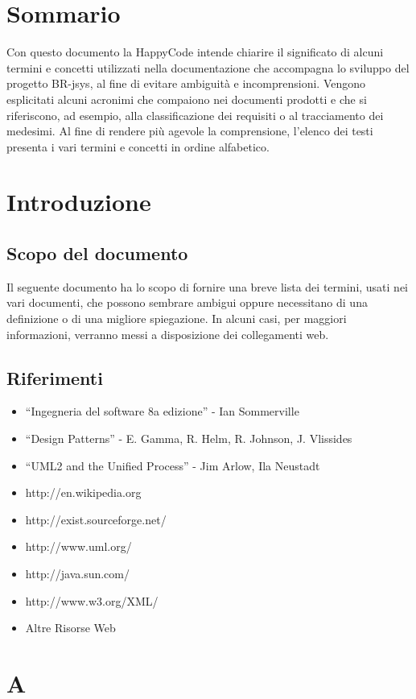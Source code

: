 \chapter*{Sommario}
Con questo documento la HappyCode intende chiarire il significato di alcuni termini e concetti utilizzati nella documentazione che accompagna
lo sviluppo del progetto BR-jsys, al fine di evitare ambiguit\`a e incomprensioni. Vengono esplicitati alcuni acronimi che compaiono nei documenti
prodotti e che si riferiscono, ad esempio, alla classificazione dei requisiti o al tracciamento dei medesimi.
Al fine di rendere pi\`u agevole la comprensione, l'elenco dei testi presenta i vari termini e concetti in ordine alfabetico.


\chapter{Introduzione}
\section{Scopo del documento}
Il seguente documento ha lo scopo di fornire una breve lista dei termini, usati nei vari documenti, che possono sembrare ambigui oppure necessitano di una definizione o di una migliore spiegazione. In alcuni casi, per maggiori informazioni, verranno messi a disposizione dei collegamenti web.
\section{Riferimenti}
\begin{itemize}
\item ``Ingegneria del software 8a edizione'' - Ian Sommerville
\item ``Design Patterns'' - E. Gamma, R. Helm, R. Johnson, J. Vlissides
\item ``UML2 and the Unified Process'' - Jim Arlow, Ila Neustadt
\item http://en.wikipedia.org
\item http://exist.sourceforge.net/
\item http://www.uml.org/
\item http://java.sun.com/
\item http://www.w3.org/XML/
\item Altre Risorse Web


\end{itemize}
\chapter{A}
